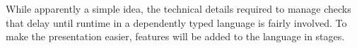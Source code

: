 



While apparently a simple idea, the technical details required to manage checks that delay until runtime in a dependently typed language is fairly involved.
To make the presentation easier, features will be added to the language in stages.

